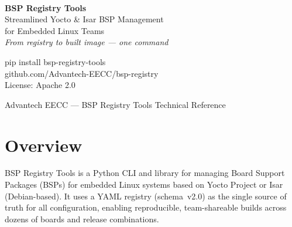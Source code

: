 \documentclass[a4paper,11pt]{article}
\begin{document}
\begin{titlepage}
  \pagecolor{white}
  \noindent\colorbox{accent}{\rule{0pt}{6pt}\hspace{\paperwidth}}\\[28mm]

  \begin{center}
    {\Huge\bfseries\color{titleblue} BSP Registry Tools}\\[6mm]
    {\Large\color{gray!80}
      Streamlined Yocto \& Isar BSP Management\\[2mm]
      for Embedded Linux Teams}\\[10mm]
    {\large\itshape\color{gray}
      From registry to built image --- one command}\\[16mm]

    \begin{tcolorbox}[
        enhanced, width=128mm,
        colback=sectionbg, colframe=accent, boxrule=0.8pt, arc=4pt,
        left=8pt, right=8pt, top=6pt, bottom=6pt]
      \ttfamily\small pip install bsp-registry-tools\\[2pt]
      \ttfamily\small github.com/Advantech-EECC/bsp-registry\\[2pt]
      \ttfamily\small License: Apache 2.0
    \end{tcolorbox}
  \end{center}

  \vfill
  \noindent\colorbox{accent}{%
    \parbox{\paperwidth}{%
      \centering\small\color{white}\bfseries
      \rule{0pt}{14pt}Advantech EECC --- BSP Registry Tools Technical Reference\rule{0pt}{4pt}%
    }%
  }
  \restoregeometry
\end{titlepage}

\setcounter{page}{2}
\tableofcontents
\clearpage

\section{Overview}

BSP Registry Tools is a Python CLI and library for managing Board Support
Packages (BSPs) for embedded Linux systems based on Yocto Project or Isar
(Debian-based). It uses a YAML registry (schema~v2.0) as the single source of
truth for all configuration, enabling reproducible, team-shareable builds across
dozens of boards and release combinations.
\end{document}

